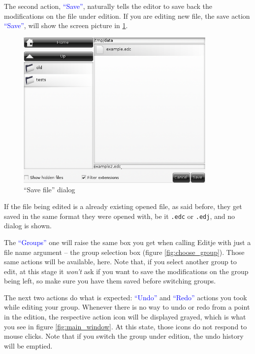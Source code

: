 \documentclass[a4paper]{profusion}
\newcommand{\GUIIcon}[1]{\textcolor{blue}{#1}}    %
\begin{document}
\begin{description}
  The second action, \GUIIcon{``Save''}, naturally tells the editor to
  save back the modifications on the file under edition.
  If you are editing new file, the save action
  \GUIIcon{``Save''}, will show the screen picture in \ref{fig:save_file}.
  \begin{figure}[h!]
    \centering
    \includegraphics[width=0.87\textwidth]{images/save_file.png}
    \caption{``Save file'' dialog}
    \label{fig:save_file}
  \end{figure}
  If the file being edited is a already existing opened file, as said
  before, they get saved in the same format they were opened with, be
  it \texttt{.edc} or \texttt{.edj}, and no dialog is shown.

  The \GUIIcon{``Groups''} one will raise the same box you get when
  calling Editje with just a file name argument -- the group selection
  box (figure \ref{fig:choose_group}). Those same actions will be
  available, here. Note that, if you select another group to edit, at
  this stage it \emph{won't} ask if you want to save the modifications
  on the group being left, so make sure you have them saved before
  switching groups.


  The next two actions do what is expected: \GUIIcon{``Undo''} and
  \GUIIcon{``Redo''} actions you took while editing your
  group. Whenever there is no way to undo or redo from a point in the
  edition, the respective action icon will be displayed grayed, which
  is what you see in figure \ref{fig:main_window}. At this state,
  those icons do not respond to mouse clicks. Note that if you switch
  the group under edition, the undo history will be emptied.


\end{description}
\end{document}
